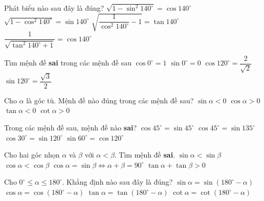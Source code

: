 \begin{ex} 
	Phát biểu nào sau đây là đúng?
	\choice
	{$\sqrt{1-\sin^2 140^\circ}=\cos 140^\circ$}
	{\True $\sqrt{1-\cos^2 140^\circ}=\sin 140^\circ$}
	{$\sqrt{\dfrac{1}{\cos^2 140^\circ}-1}=\tan 140^\circ$}
	{$\dfrac{1}{\sqrt{\tan^2 140^\circ+1}}=\cos 140^\circ$}
\end{ex}
\begin{ex}
	Tìm mệnh đề \textbf{sai} trong các mệnh đề sau
	\choice
	{$\cos 0^\circ=1$}
	{$\sin 0^\circ=0$}
	{\True $\cos 120^\circ=\dfrac{2}{\sqrt{2}}$}
	{$\sin 120^\circ=\dfrac{\sqrt{3}}{2}$}
\end{ex}
\begin{ex}
	Cho $\alpha$ là góc tù. Mệnh đề nào đúng trong các mệnh đề sau?
	\choice
	{$\sin\alpha<0$}
	{$\cos\alpha>0$}
	{\True $\tan\alpha<0$}
	{$\cot\alpha>0$}
\end{ex}
\begin{ex}
	Trong các mệnh đề sau, mệnh đề nào \textbf{sai}?
	\choice
	{$\cos 45^\circ=\sin 45^\circ$}
	{$\cos 45^\circ=\sin 135^\circ$}
	{$\cos 30^\circ=\sin 120^\circ$}
	{\True $\sin 60^\circ=\cos 120^\circ$}
\end{ex}
\begin{ex}
	Cho hai góc nhọn $\alpha$ và $\beta$ với $\alpha<\beta$. Tìm mệnh đề \textbf{sai}.
	\choice
	{$\sin\alpha<\sin\beta$}
	{\True $\cos\alpha<\cos\beta$}
	{$\cos\alpha=\sin\beta\Leftrightarrow \alpha+\beta=90^\circ$}
	{$\tan\alpha+\tan\beta>0$}
\end{ex}
\begin{ex}
	Cho $0^{\circ}\leq\alpha\leq 180^{\circ}$. Khẳng định nào sau đây là đúng?
	\choice
	{\True $\sin\alpha=\sin(180^{\circ}-\alpha)$}
	{$\cos\alpha=\cos(180^{\circ}-\alpha)$}
	{$\tan\alpha=\tan(180^{\circ}-\alpha)$}
	{$\cot\alpha=\cot(180^{\circ}-\alpha)$}
\end{ex}

